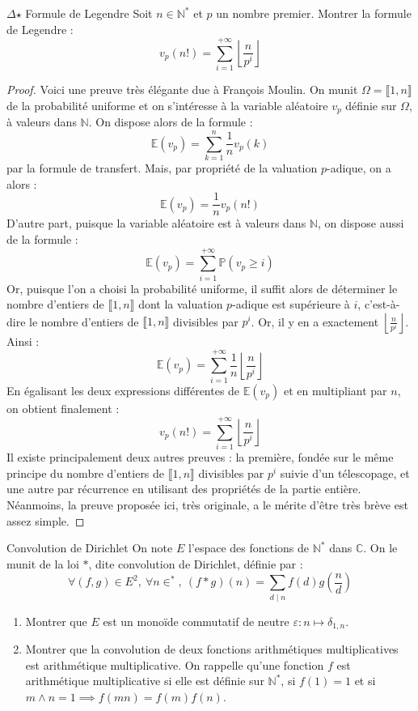 \documentclass[french,a4paper]{article}
\renewcommand{\P}{\mathbb{P}}
\newcommand{\N}{\mathbb{N}}
\newcommand{\C}{\mathbb{C}}
\newcommand{\st}{^*}
\newcommand{\E}{\mathbb{E}}
\theoremstyle{plain}
\theoremstyle{definition}
\theoremstyle{remark}
\begin{document}
\begin{ex}[Révisions]{$\Delta$$\star$ Formule de Legendre}
	Soit $n\in\N\st$ et $p$ un nombre premier. Montrer la formule de Legendre : $$v_p(n!)=\sum_{i=1}^{+\infty}\left\lfloor\frac{n}{p^i}\right\rfloor$$
\end{ex}
\begin{proof}
	Voici une preuve très élégante due à François Moulin. On munit $\Omega=\llbracket1,n\rrbracket$ de la probabilité uniforme et on s'intéresse à la variable aléatoire $v_p$ définie sur $\Omega$, à valeurs dans $\N$. On dispose alors de la formule : $$\E(v_p)=\sum_{k=1}^{n}\frac{1}{n}v_p(k)$$ par la formule de transfert. Mais, par propriété de la valuation $p$-adique, on a alors : $$\E(v_p)=\frac{1}{n}v_p(n!)$$ D'autre part, puisque la variable aléatoire est à valeurs dans $\N$, on dispose aussi de la formule : $$\E(v_p)=\sum_{i=1}^{+\infty}\P(v_p\geqslant i)$$ Or, puisque l'on a choisi la probabilité uniforme, il suffit alors de déterminer le nombre d'entiers de $\llbracket1,n\rrbracket$ dont la valuation $p$-adique est supérieure à $i$, c'est-à-dire le nombre d'entiers de $\llbracket1,n\rrbracket$ divisibles par $p^i$. Or, il y en a exactement $\displaystyle\left\lfloor\frac{n}{p^i}\right\rfloor$. Ainsi : $$\E(v_p)=\sum_{i=1}^{+\infty}\frac{1}{n}\left\lfloor\frac{n}{p^i}\right\rfloor$$ En égalisant les deux expressions différentes de $\E(v_p)$ et en multipliant par $n$, on obtient finalement : $$v_p(n!)=\sum_{i=1}^{+\infty}\left\lfloor\frac{n}{p^i}\right\rfloor$$
	Il existe principalement deux autres preuves : la première, fondée sur le même principe du nombre d'entiers de $\llbracket1,n\rrbracket$ divisibles par $p^i$ suivie d'un télescopage, et une autre par récurrence en utilisant des propriétés de la partie entière. Néanmoins, la preuve proposée ici, très originale, a le mérite d'être très brève est assez simple.
\end{proof}

\begin{ex}{Convolution de Dirichlet}
	On note $E$ l'espace des fonctions de $\N\st$ dans $\C$. On le munit de la loi $*$, dite convolution de Dirichlet, définie par : $$\forall (f,g)\in E^2,\ \forall n\in\st,\ (f*g)(n)=\sum_{d\mid n}f(d)g\left(\frac{n}{d}\right)$$
	\begin{enumerate}
		\item Montrer que $E$ est un monoïde commutatif de neutre $\varepsilon:n\mapsto\delta_{1,n}$.
		\item Montrer que la convolution de deux fonctions arithmétiques multiplicatives est arithmétique multiplicative. On rappelle qu'une fonction $f$ est arithmétique multiplicative si elle est définie sur $\N\st$, si $f(1)=1$ et si $m\wedge n=1\implies f(mn)=f(m)f(n)$.
	\end{enumerate}
\end{ex}
\end{document}
